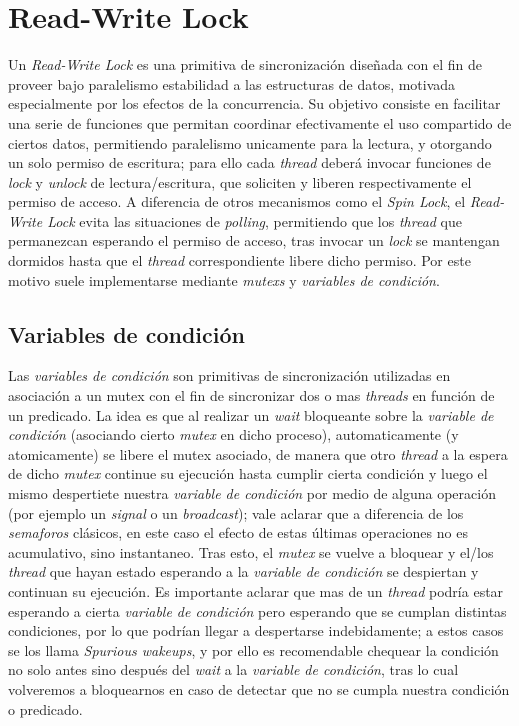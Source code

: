 \section{Read-Write Lock}

Un \textit{Read-Write Lock} es una primitiva de sincronización diseñada con el fin de proveer bajo paralelismo estabilidad a las estructuras de datos, motivada especialmente por los efectos de la concurrencia.
Su objetivo consiste en facilitar una serie de funciones que permitan coordinar efectivamente el uso compartido de ciertos datos, permitiendo paralelismo unicamente para la lectura, y otorgando un solo permiso de escritura; para ello cada \textit{thread} deberá invocar funciones de \textit{lock} y \textit{unlock} de lectura/escritura, que soliciten y liberen respectivamente el permiso de acceso.   
A diferencia de otros mecanismos como el \textit{Spin Lock}, el \textit{Read-Write Lock} evita las situaciones de \textit{polling}, permitiendo que los \textit{thread} que permanezcan esperando el permiso de acceso, tras invocar un \textit{lock} se mantengan dormidos hasta que el \textit{thread} correspondiente libere dicho permiso. Por este motivo suele implementarse mediante \textit{mutexs} y \textit{variables de condición}.  

\subsection{Variables de condición}
  Las \textit{variables de condición} son primitivas de sincronización utilizadas en asociación a un mutex con el fin de sincronizar dos o mas \textit{threads} en función de un predicado. La idea es que al realizar un \textit{wait} bloqueante sobre la \textit{variable de condición} (asociando cierto \textit{mutex} en dicho proceso), automaticamente (y atomicamente) se libere el mutex asociado, de manera que otro \textit{thread} a la espera de dicho \textit{mutex} continue su ejecución hasta cumplir cierta condición y luego el mismo despertiete nuestra \textit{variable de condición} por medio de alguna operación (por ejemplo un \textit{signal} o un \textit{broadcast}); vale aclarar que a diferencia de los \textit{semaforos} clásicos, en este caso el efecto de estas últimas operaciones no es acumulativo, sino instantaneo. Tras esto, el \textit{mutex} se vuelve a bloquear y el/los \textit{thread} que hayan estado esperando a la \textit{variable de condición} se despiertan y continuan su ejecución. Es importante aclarar que mas de un \textit{thread} podría estar esperando a cierta \textit{variable de condición} pero esperando que se cumplan distintas condiciones, por lo que podrían llegar a despertarse indebidamente; a estos casos se los llama \textit{Spurious wakeups}, y por ello es recomendable chequear la condición no solo antes sino después del \textit{wait} a la \textit{variable de condición}, tras lo cual volveremos a bloquearnos en caso de detectar que no se cumpla nuestra condición o predicado.

